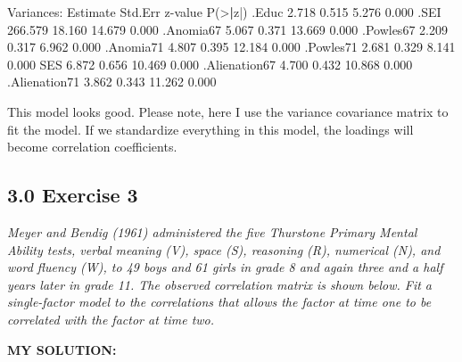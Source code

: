 \documentclass[
]{article}
\newenvironment{Shaded}{\begin{snugshade}}{\end{snugshade}}
\newcommand{\ErrorTok}[1]{\textcolor[rgb]{0.64,0.00,0.00}{\textbf{#1}}}
\newcommand{\FloatTok}[1]{\textcolor[rgb]{0.00,0.00,0.81}{#1}}
\newcommand{\FunctionTok}[1]{\textcolor[rgb]{0.00,0.00,0.00}{#1}}
\newcommand{\NormalTok}[1]{#1}
\newcommand{\SpecialCharTok}[1]{\textcolor[rgb]{0.00,0.00,0.00}{#1}}
\begin{document}
\begin{Shaded}
\begin{Highlighting}[]
\NormalTok{Variances}\SpecialCharTok{:}
\NormalTok{                   Estimate  Std.Err  z}\SpecialCharTok{{-}}\NormalTok{value  }\FunctionTok{P}\NormalTok{(}\SpecialCharTok{\textgreater{}}\ErrorTok{|}\NormalTok{z}\SpecialCharTok{|}\NormalTok{)}
\NormalTok{   .Educ              }\FloatTok{2.718}    \FloatTok{0.515}    \FloatTok{5.276}    \FloatTok{0.000}
\NormalTok{   .SEI             }\FloatTok{266.579}   \FloatTok{18.160}   \FloatTok{14.679}    \FloatTok{0.000}
\NormalTok{   .Anomia67          }\FloatTok{5.067}    \FloatTok{0.371}   \FloatTok{13.669}    \FloatTok{0.000}
\NormalTok{   .Powles67          }\FloatTok{2.209}    \FloatTok{0.317}    \FloatTok{6.962}    \FloatTok{0.000}
\NormalTok{   .Anomia71          }\FloatTok{4.807}    \FloatTok{0.395}   \FloatTok{12.184}    \FloatTok{0.000}
\NormalTok{   .Powles71          }\FloatTok{2.681}    \FloatTok{0.329}    \FloatTok{8.141}    \FloatTok{0.000}
\NormalTok{    SES               }\FloatTok{6.872}    \FloatTok{0.656}   \FloatTok{10.469}    \FloatTok{0.000}
\NormalTok{   .Alienation67      }\FloatTok{4.700}    \FloatTok{0.432}   \FloatTok{10.868}    \FloatTok{0.000}
\NormalTok{   .Alienation71      }\FloatTok{3.862}    \FloatTok{0.343}   \FloatTok{11.262}    \FloatTok{0.000}
\end{Highlighting}
\end{Shaded}

This model looks good. Please note, here I use the variance covariance
matrix to fit the model. If we standardize everything in this model, the
loadings will become correlation coefficients.

\hypertarget{exercise-3}{%
\subsection{3.0 Exercise 3}\label{exercise-3}}

\emph{Meyer and Bendig (1961) administered the five Thurstone Primary
Mental Ability tests, verbal meaning (V), space (S), reasoning (R),
numerical (N), and word fluency (W), to 49 boys and 61 girls in grade 8
and again three and a half years later in grade 11. The observed
correlation matrix is shown below. Fit a single-factor model to the
correlations that allows the factor at time one to be correlated with
the factor at time two.}

\textbf{MY SOLUTION: }
\end{document}
